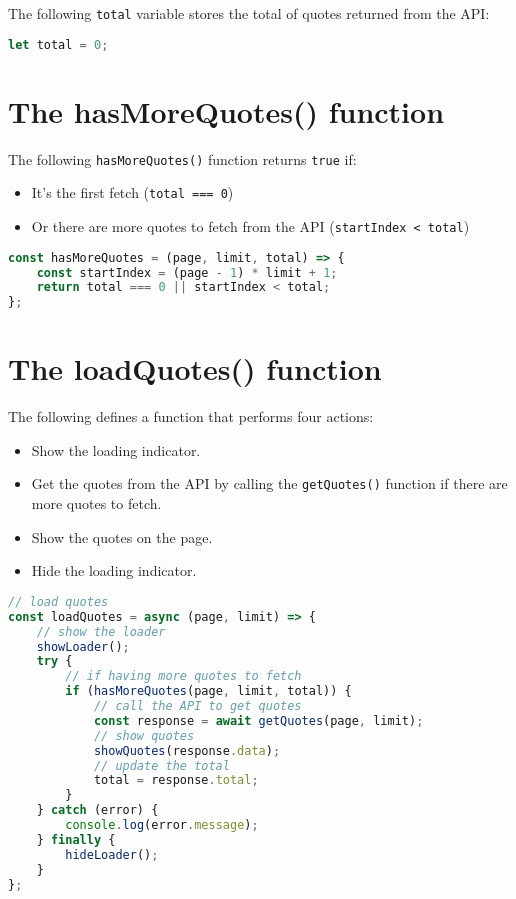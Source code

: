 \documentclass[11pt]{article}
\begin{document}
\noindent
The following \verb|total| variable stores the total of quotes
returned from the API:

\begin{lstlisting}[language=JavaScript]
let total = 0;
\end{lstlisting}

\section*{The hasMoreQuotes() function}

The following \verb|hasMoreQuotes()| function returns \verb|true| if:
\begin{itemize}
\item It's the first fetch (\verb|total === 0|)
\item Or there are more quotes to fetch from the API (\verb|startIndex < total|)
\end{itemize}
\begin{lstlisting}[language=JavaScript]
const hasMoreQuotes = (page, limit, total) => {
    const startIndex = (page - 1) * limit + 1;
    return total === 0 || startIndex < total;
};
\end{lstlisting}

\section*{The loadQuotes() function}

The following defines a function that performs four actions:
\begin{itemize}
\item Show the loading indicator.
\item Get the quotes from the API by calling the \verb|getQuotes()| function
if there are more quotes to fetch.
\item Show the quotes on the page.
\item Hide the loading indicator.
\end{itemize}
\newpage
\begin{lstlisting}[language=JavaScript]
// load quotes
const loadQuotes = async (page, limit) => {
    // show the loader
    showLoader();
    try {
        // if having more quotes to fetch
        if (hasMoreQuotes(page, limit, total)) {
            // call the API to get quotes
            const response = await getQuotes(page, limit);
            // show quotes
            showQuotes(response.data);
            // update the total
            total = response.total;
        }
    } catch (error) {
        console.log(error.message);
    } finally {
        hideLoader();
    }
};
\end{lstlisting}
\end{document}
